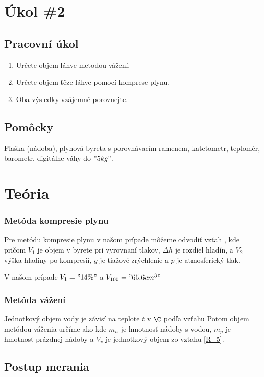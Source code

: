 \documentclass[10pt]{scrartcl}
\begin{document}
\section{Úkol \#2}
\subsection{Pracovní úkol}
\begin{enumerate}
\item Určete objem láhve metodou vážení.
\item Určete objem ťěze láhve pomocí komprese plynu.
\item Oba výsledky vzájemně porovnejte.
\end{enumerate}


\subsection{Pomôcky}
Fľaška (nádoba), plynová byreta s porovnávacím ramenem, katetometr,
teploměr, barometr, digitálne váhy do $"5 kg"$.

\section{Teória}

\subsubsection{Metóda kompresie plynu}
Pre metódu kompresie plynu v našom prípade môžeme odvodiť vzťah
, kde 
pričom $V_1$ je objem v byrete pri vyrovnaní tlakov, $\Delta h$ je rozdiel hladín, a $V_2$ výška hladiny po kompresií, $g$ je tiažové zrýchlenie a $p$ je atmosferický tlak.

V našom prípade $V_1="14 \%"$ a $V_{100} = "65.6 cm^3"$

\subsubsection{Metóda vážení}
Jednotkový objem vody je závisí na teplote $t$ v $\C$ podľa vzťahu
Potom objem metódou váženia určíme ako
kde $m_n$ je hmotnosť nádoby s vodou, $m_p$ je hmotnosť prázdnej nádoby a $V_v$ je jednotkový objem zo vzťahu \ref{R_5}.

\subsection{Postup merania}
\end{document}
